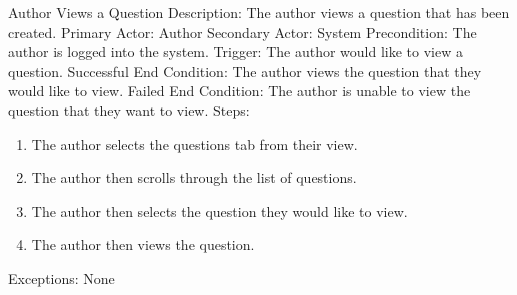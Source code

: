     
    \begin{section}{Author Views a Question}
        Description: The author views a question that has been created. \newline
        Primary Actor: Author \newline
        Secondary Actor: System \newline
        Precondition: The author is logged into the system. \newline
        Trigger: The author would like to view a question. \newline
        Successful End Condition: The author views the question that they would like to view. \newline
        Failed End Condition: The author is unable to view the question that they want to view. \newline
        \newline
        Steps:
        \begin{enumerate}
            \item{The author selects the questions tab from their view.}
            \item{The author then scrolls through the list of questions.}
            \item{The author then selects the question they would like to view.}
            \item{The author then views the question.}
        \end{enumerate}
        Exceptions: None
    \end{section}
    
